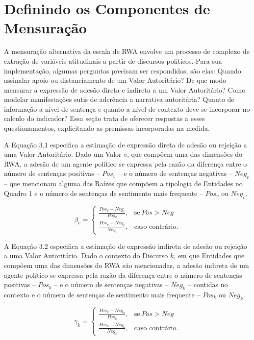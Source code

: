 \documentclass[
12pt,				%
openright,			%
twoside,			%
a4paper,			%
english,			%
french,				%
spanish,			%
brazil				%
]{abntex2}
\begin{document}
\section{Definindo os Componentes de Mensuração}

A mensuração alternativa da escala de RWA envolve um processo de complexo de extração de variáveis atitudinais a partir de discursos políticos. Para sua implementação, algumas perguntas precisam ser respondidas, são elas: Quando assinalar apoio ou distanciamento de um Valor Autoritário? De que modo mensurar a expressão de adesão direta e indireta a um Valor Autoritário? Como modelar manifestações sutis de aderência a narrativa autoritária? Quanto de informação a nível de sentença e quanto a nível de contexto deve-se incorporar no calculo do indicador? Essa seção trata de oferecer respostas a esses questionamentos, explicitando as premissas incorporadas na medida. 

A Equação 3.1 especifica a estimação de expressão direta de adesão ou rejeição a uma Valor Autoritário. Dado um Valor $v$, que compõem uma das dimensões do RWA, a adesão de um agente político se expressa pela razão da diferença entre o número de sentenças positivas -- $Pos_v$ --  e o número de sentenças negativas -- $Neg_v$ -- que mencionam alguma das Raízes que compõem a tipologia de Entidades no Quadro 1 e o número de sentenças de sentimento mais frequente -- $Pos_v$ ou $Neg_v$.

\begin{equation}
\beta_v = 
\begin{cases}
\frac{Pos_v - Neg_v}{Pos_v}, & \text{se}\ Pos > Neg \\
\frac{Pos_v - Neg_v}{Neg_v}, & \text{caso contrário.}
\end{cases}
\end{equation}

A Equação 3.2 especifica a estimação de expressão indireta de adesão ou rejeição a uma Valor Autoritário. Dado o contexto do Discurso $k$, em que Entidades que compõem uma das dimensões do RWA são mencionadas, a adesão indireta de um agente político se expressa pela razão da diferença entre o número de sentenças positivas -- $Pos_k$ --  e o número de sentenças negativas -- $Neg_k$ -- contidas no contexto e o número de sentenças de sentimento mais frequente -- $Pos_k$ ou $Neg_k$.

\begin{equation}
\gamma_k = 
\begin{cases}
\frac{Pos_k - Neg_k}{Pos_k}, & \text{se}\ Pos > Neg \\
\frac{Pos_k - Neg_k}{Neg_k}, & \text{caso contrário.}
\end{cases}
\end{equation}
\end{document}
